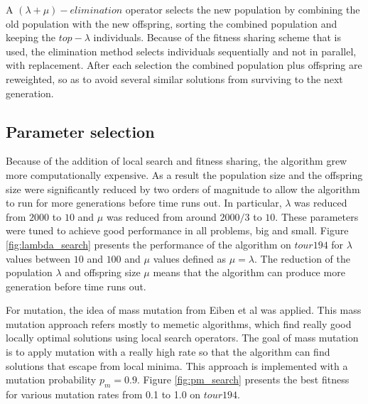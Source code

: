 \documentclass[a4paper,10pt]{article}
\newcommand{\ReplaceMe}[1]{{\color{blue}#1}}
\begin{document}
A $(\lambda+\mu)-elimination$ operator selects the new population by combining the old population with the new offspring, sorting the combined population and keeping the $top-\lambda$ individuals. Because of the fitness sharing scheme that is used, the elimination method selects individuals sequentially and not in parallel, with replacement. After each selection the combined population plus offspring are reweighted, so as to avoid several similar solutions from surviving to the next generation.

\subsection{Parameter selection}\label{ss:parameter_selection}


Because of the addition of local search and fitness sharing, the algorithm grew more computationally expensive. As a result the population size and the offspring size were significantly reduced by two orders of magnitude to allow the algorithm to run for more generations before time runs out. In particular, $\lambda$ was reduced from $2000$ to $10$ and $\mu$ was reduced from around $2000/3$ to $10$. These parameters were tuned to achieve good performance in all problems, big and small. Figure \ref{fig:lambda_search} presents the performance of the algorithm on $tour194$ for $\lambda$ values between $10$ and $100$ and $\mu$ values defined as $\mu = \lambda$. The reduction of the population $\lambda$ and offspring size $\mu$ means that the algorithm can produce more generation before time runs out.

For mutation, the idea of mass mutation from Eiben et al \cite{eiben} was applied. This mass mutation approach refers mostly to memetic algorithms, which find really good locally optimal solutions using local search operators. The goal of mass mutation is to apply mutation with a really high rate so that the algorithm can find solutions that escape from local minima. This approach is implemented with a mutation probability $p_m = 0.9$. Figure \ref{fig:pm_search} presents the best fitness for various mutation rates from 0.1 to 1.0 on $tour194$.
\end{document}
